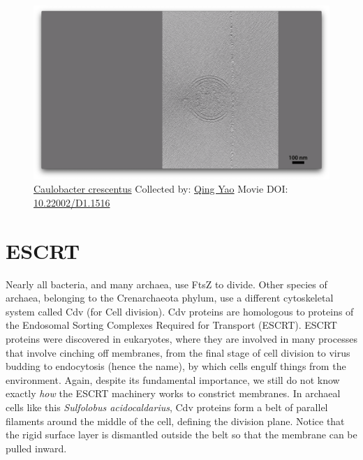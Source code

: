 \documentclass[]{tufte-book}
\begin{document}
\begin{figure}
\includegraphics{movie_stills/5_10} \caption[\protect\hyperlink{tree}{Caulobacter crescentus} Collected
by: \protect\hyperlink{qing_yao}{Qing Yao} Movie DOI:
\href{https://doi.org/10.22002/D1.1516}{10.22002/D1.1516}]{\protect\hyperlink{tree}{Caulobacter crescentus} Collected
by: \protect\hyperlink{qing_yao}{Qing Yao} Movie DOI:
\href{https://doi.org/10.22002/D1.1516}{10.22002/D1.1516}}\label{fig:5-10}
\end{figure}

\section{ESCRT}\label{escrt}

Nearly all bacteria, and many archaea, use FtsZ to divide. Other species
of archaea, belonging to the Crenarchaeota phylum, use a different
cytoskeletal system called Cdv (for Cell division). Cdv proteins are
homologous to proteins of the Endosomal Sorting Complexes Required for
Transport (ESCRT). ESCRT proteins were discovered in eukaryotes, where
they are involved in many processes that involve cinching off membranes,
from the final stage of cell division to virus budding to endocytosis
(hence the name), by which cells engulf things from the environment.
Again, despite its fundamental importance, we still do not know exactly
\emph{how} the ESCRT machinery works to constrict membranes. In archaeal
cells like this \emph{Sulfolobus acidocaldarius}, Cdv proteins form a
belt of parallel filaments around the middle of the cell, defining the
division plane. Notice that the rigid surface layer is dismantled
outside the belt so that the membrane can be pulled inward.
\end{document}
